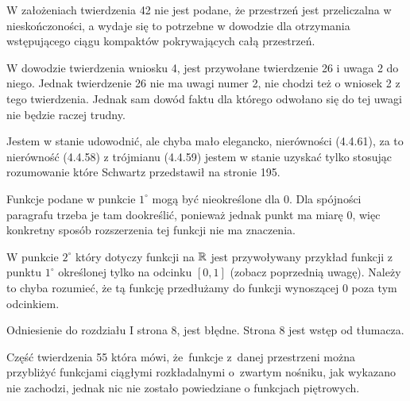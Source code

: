 \documentclass[a4paper,11pt]{article}
\numberwithin{equation}{section}
\begin{document}
\noindent
{} W założeniach twierdzenia 42 nie jest podane, że
przestrzeń jest przeliczalna w nieskończoności, a wydaje się to
potrzebne w dowodzie dla otrzymania wstępującego ciągu kompaktów
pokrywających całą przestrzeń.

\VerSpaceFour





\noindent
{} W dowodzie twierdzenia wniosku 4, jest przywołane
twierdzenie 26 i uwaga 2 do niego. Jednak twierdzenie 26 nie ma uwagi
numer 2, nie chodzi też o wniosek 2 z tego twierdzenia. Jednak sam
dowód faktu dla którego odwołano się do tej uwagi nie będzie raczej
trudny.

\vspace{\spaceFour}



\start {} Jestem w stanie udowodnić, ale chyba mało elegancko,
nierówności (4.4.61), za to nierówność (4.4.58) z trójmianu (4.4.59)
jestem w stanie uzyskać tylko stosując rozumowanie które Schwartz
przedstawił na stronie 195.

\vspace{\spaceFour}



\start {} Funkcje podane w punkcie $1^{ \circ }$ mogą być
nieokreślone dla 0. Dla spójności paragrafu trzeba je tam dookreślić,
ponieważ jednak punkt ma miarę 0, więc konkretny sposób rozszerzenia
tej funkcji nie ma znaczenia.

\vspace{\spaceFour}



\start {} W punkcie $2^{ \circ }$ który dotyczy funkcji na
$\mathbb{R}$ jest przywoływany przykład funkcji z punktu $1^{ \circ }$
określonej tylko na odcinku $[ 0, 1 ]$ (zobacz poprzednią uwagę).
Należy to chyba rozumieć, że tą funkcję przedłużamy do funkcji
wynoszącej 0 poza tym odcinkiem.

\vspace{\spaceFour}



\start {} Odniesienie do rozdziału I strona 8, jest błędne.
Strona 8 jest wstęp od tłumacza.

\vspace{\spaceFour}



\start {} Część twierdzenia 55 która mówi, że~funkcje z~danej
przestrzeni można przybliżyć funkcjami ciągłymi rozkładalnymi
o~zwartym nośniku, jak wykazano nie zachodzi, jednak nic nie zostało
powiedziane o funkcjach piętrowych.
\end{document}
